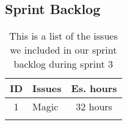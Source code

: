\subsection{Sprint Backlog}\label{subsec:spr4_sprblog}
\begin{longtable} { | c | p{12cm} | c | } 
\hline
	ID 	&	Issues	&	Es. hours  \\\hline
	1	& 	Magic	&	32 hours  \\\hline
\caption{This is a list of the issues we included in our sprint backlog during sprint 3}
\label{tab:spr4_prodblog}
\end{longtable}